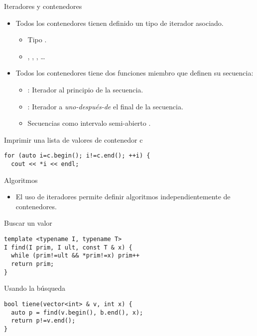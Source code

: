 \begin{frame}[t,fragile]{Iteradores y contenedores}
\begin{itemize}
  \item Todos los contenedores tienen definido un tipo de iterador asociado.
    \begin{itemize}
      \item Tipo .
      \item {}, , , \ldots
    \end{itemize}
  \item Todos los contenedores tiene dos funciones miembro que definen su secuencia:
    \begin{itemize}
      \item {}: Iterador al principio de la secuencia.
      \item {}: Iterador a \emph{uno-después-de} el final de la secuencia.
      \item Secuencias como intervalo semi-abierto \cppid{[inicio, fin)}.
    \end{itemize}
\end{itemize}
\begin{block}{Imprimir una lista de valores de contenedor c}
\begin{lstlisting}[]
for (auto i=c.begin(); i!=c.end(); ++i) {
  cout << *i << endl;
\end{lstlisting}
\end{block}
\end{frame}

\begin{frame}[t,fragile]{Algoritmos}
\begin{itemize}
  \item El uso de iteradores permite definir algoritmos independientemente
        de contenedores.
\end{itemize}
\begin{block}{Buscar un valor}
\begin{lstlisting}[]
template <typename I, typename T>
I find(I prim, I ult, const T & x) {
  while (prim!=ult && *prim!=x) prim++
  return prim;
}
\end{lstlisting}
\end{block}
\pause
\begin{block}{Usando la búsqueda}
\begin{lstlisting}[]
bool tiene(vector<int> & v, int x) {
  auto p = find(v.begin(), b.end(), x);
  return p!=v.end();
}
\end{lstlisting}
\end{block}
\end{frame}


